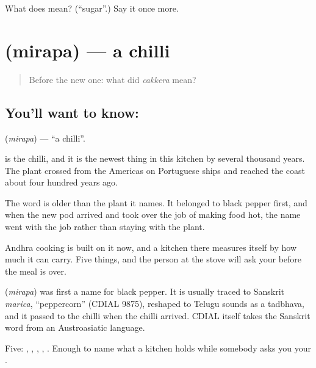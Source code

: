 \begin{tcolorbox}[breakable,colback=teal!4,colframe=teal!35!black,title={Before you move on}]
What does  mean? (\textquotedblleft{}sugar\textquotedblright{}.) Say it once more.
\end{tcolorbox}
\section[\texorpdfstring{\te{మిరప} (mirapa)}{మిరప (mirapa)}]{ (mirapa) — a chilli}

\label{lesson:TE-C61-chilli}



\begin{quote}
Before the new one: what did \emph{cakkera} mean?
\end{quote}

\subsection*{You'll want to know: }
\textbf{} (\emph{mirapa}) — \textquotedblleft{}a chilli\textquotedblright{}.

 is the chilli, and it is the newest thing in this kitchen by several thousand years. The plant crossed from the Americas on Portuguese ships and reached the coast about four hundred years ago.

The word is older than the plant it names. It belonged to black pepper first, and when the new pod arrived and took over the job of making food hot, the name went with the job rather than staying with the plant.

Andhra cooking is built on it now, and a kitchen there measures itself by how much  it can carry. Five things, and the person at the stove will ask your  before the meal is over.

\begin{cousinweb}
\textbf{} (\emph{mirapa}) was first a name for black pepper. It is usually traced to Sanskrit \emph{marica}, \textquotedblleft{}peppercorn\textquotedblright{} (CDIAL 9875), reshaped to Telugu sounds as a tadbhava, and it passed to the chilli when the chilli arrived. CDIAL itself takes the Sanskrit word from an Austroasiatic language.
\end{cousinweb}

\begin{grammarlens}[title={What you've built}]
Five: , , , , . Enough to name what a kitchen holds while somebody asks you your .
\end{grammarlens}

